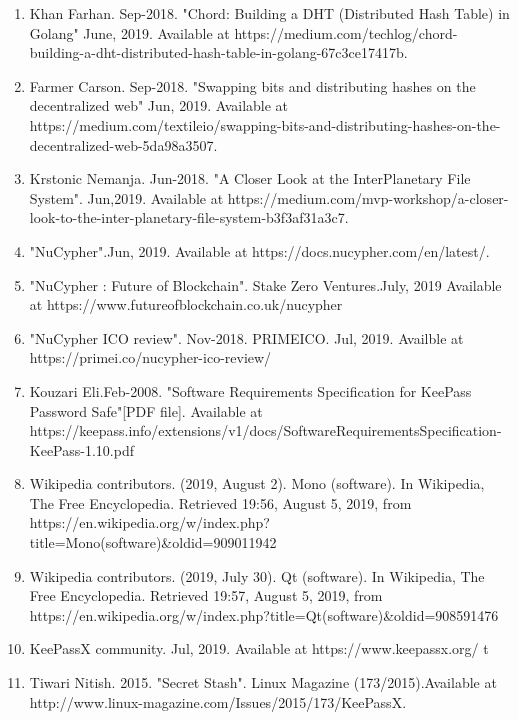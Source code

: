 \documentclass[12pt]{article}
\begin{document}
\begin{enumerate}
\item Khan Farhan. Sep-2018. "Chord: Building a DHT (Distributed Hash Table) in Golang" June, 2019. Available at https://medium.com/techlog/chord-building-a-dht-distributed-hash-table-in-golang-67c3ce17417b.

\item Farmer Carson. Sep-2018. "Swapping bits and distributing hashes on the decentralized web" Jun, 2019.  Available at https://medium.com/textileio/swapping-bits-and-distributing-hashes-on-the-decentralized-web-5da98a3507.

\item Krstonic Nemanja. Jun-2018. "A Closer Look at the InterPlanetary File System". Jun,2019. Available at https://medium.com/mvp-workshop/a-closer-look-to-the-inter-planetary-file-system-b3f3af31a3c7.

\item "NuCypher".Jun, 2019. Available at https://docs.nucypher.com/en/latest/.

\item "NuCypher : Future of Blockchain". Stake Zero Ventures.July, 2019
Available at https://www.futureofblockchain.co.uk/nucypher

\item "NuCypher ICO review". Nov-2018. PRIMEICO. Jul, 2019. Availble at https://primei.co/nucypher-ico-review/
 
\item Kouzari Eli.Feb-2008. "Software Requirements Specification for KeePass Password Safe"[PDF file]. Available at https://keepass.info/extensions/v1/docs/SoftwareRequirementsSpecification-KeePass-1.10.pdf 

\item Wikipedia contributors. (2019, August 2). Mono (software). In Wikipedia, The Free Encyclopedia. Retrieved 19:56, August 5, 2019, from https://en.wikipedia.org/w/index.php?title=Mono(software)&oldid=909011942

\item Wikipedia contributors. (2019, July 30). Qt (software). In Wikipedia, The Free Encyclopedia. Retrieved 19:57, August 5, 2019, from https://en.wikipedia.org/w/index.php?title=Qt(software)&oldid=908591476

\item KeePassX community. Jul, 2019. Available at https://www.keepassx.org/
t
\item Tiwari Nitish. 2015. "Secret Stash". Linux Magazine (173/2015).Available at http://www.linux-magazine.com/Issues/2015/173/KeePassX.


\end{enumerate}
\end{document}
